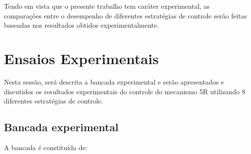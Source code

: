 \documentclass[]{politex}
\begin{document}
Tendo em vista que o presente trabalho tem caráter experimental, as comparações entre o desempenho de diferentes estratégias de controle serão feitas baseadas nos resultados obtidos experimentalmente.

\section{Ensaios Experimentais}

Nesta sessão, será descrita a bancada experimental e serão apresentados e discutidos os resultados experimentais do controle do mecanismo 5R utilizando 8 diferentes estratégias de controle.

\subsection{Bancada experimental}

A bancada é constituída de:
\end{document}
